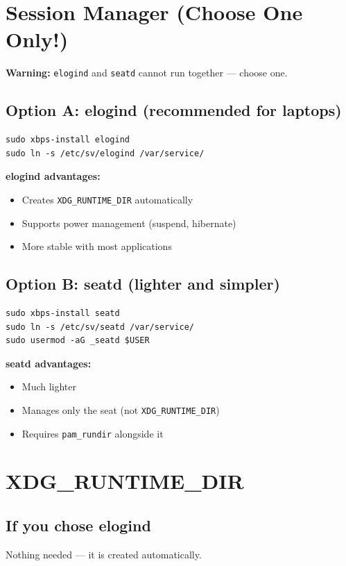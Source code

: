 \documentclass[12pt, a4paper]{book}
\begin{document}
\section{Session Manager (Choose One Only!)}

\begin{warningbox}
\textbf{Warning:} \texttt{elogind} and \texttt{seatd} cannot run together --- choose one.
\end{warningbox}

\subsection{Option A: elogind (recommended for laptops)}
\begin{lstlisting}
sudo xbps-install elogind
sudo ln -s /etc/sv/elogind /var/service/
\end{lstlisting}

\textbf{elogind advantages:}
\begin{itemize}[leftmargin=*]
  \item Creates \texttt{XDG\_RUNTIME\_DIR} automatically
  \item Supports power management (suspend, hibernate)
  \item More stable with most applications
\end{itemize}

\subsection{Option B: seatd (lighter and simpler)}
\begin{lstlisting}
sudo xbps-install seatd
sudo ln -s /etc/sv/seatd /var/service/
sudo usermod -aG _seatd $USER
\end{lstlisting}

\textbf{seatd advantages:}
\begin{itemize}[leftmargin=*]
  \item Much lighter
  \item Manages only the seat (not \texttt{XDG\_RUNTIME\_DIR})
  \item Requires \texttt{pam\_rundir} alongside it
\end{itemize}

\section{XDG\_RUNTIME\_DIR}

\subsection{If you chose elogind}
Nothing needed --- it is created automatically.
\end{document}
